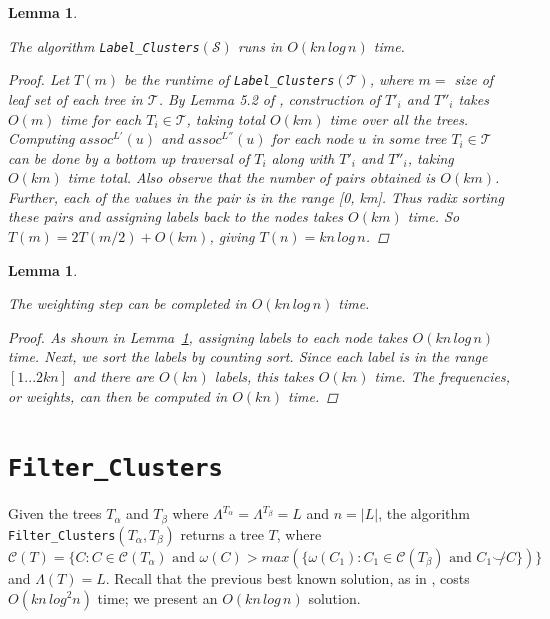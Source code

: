 \documentclass{article}
\newcommand{\compatible}{\smile}
\newcommand{\leafset}{\Lambda}
\newcommand{\weight}{\omega}
\newcommand{\TA}{T_\alpha}
\newcommand{\TB}{T_\beta}
\newtheorem{labelclustersruntime}[incompatibility]{Lemma}
\newtheorem{weightingruntime}[incompatibility]{Lemma}
\begin{document}
    \medskip
    \begin{labelclustersruntime}
        \label{lem:labelclustersruntime}

        The algorithm \texttt{Label\_Clusters}$(\mathcal{S})$ runs in $O(kn\,log\,n)$ time.

        \begin{proof}
            Let $T(m)$ be the runtime of \texttt{Label\_Clusters}$(\mathcal{T})$, where $m =$ size of leaf set of each tree in $\mathcal{T}$. By Lemma 5.2 of \cite{farach1995fast}, construction of $T'_i$ and $T''_i$ takes $O(m)$ time for each $T_i \in \mathcal{T}$, taking total $O(km)$ time over all the trees. Computing $assoc^{L'}(u)$ and $assoc^{L''}(u)$ for each node $u$ in some tree $T_i \in \mathcal{T}$ can be done by a bottom up traversal of $T_i$ along with $T'_i$ and $T''_i$, taking $O(km)$ time total. Also observe that the number of pairs obtained is $O(km)$. Further, each of the values in the pair is in the range [0, km]. Thus radix sorting these pairs and assigning labels back to the nodes takes $O(km)$ time. So $T(m) = 2T(m/2) + O(km)$, giving $T(n) = kn\,log\,n$.
        \end{proof}
    \end{labelclustersruntime}

    \medskip
    \begin{weightingruntime}
        \label{lem:weightingruntime}

        The weighting step can be completed in $O(kn\,log\,n)$ time.

        \begin{proof}
            As shown in Lemma~\ref{lem:labelclustersruntime}, assigning labels to each node takes $O(kn\,log\,n)$ time. Next, we sort the labels by counting sort. Since each label is in the range $[1 ... 2kn]$ and there are $O(kn)$ labels, this takes $O(kn)$ time. The frequencies, or weights, can then be computed in $O(kn)$ time.
        \end{proof}
    \end{weightingruntime}

    \section{\texttt{Filter\_Clusters}}
    \label{sec:filterclusters}

    Given the trees $\TA$ and $\TB$ where $\leafset^{\TA} = \leafset^{\TB} = L$ and $n = |L|$, the algorithm \texttt{Filter\_Clusters}$(\TA, \TB)$ returns a tree $T$, where $\mathcal{C}(T) = \{C : C \in \mathcal{C}(\TA) \text{ and } \weight(C) > max(\{\weight(C_1) : C_1 \in \mathcal{C}(\TB) \text{ and } C_1 \not\compatible C\})\}$ and $\leafset(T) = L$. Recall that the previous best known solution, as in \cite{jansson2018algorithms}, costs $O(kn\,log^2n)$ time; we present an $O(kn\,log\,n)$ solution.
\end{document}
